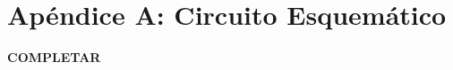 \appendix
\appendixpage
\addappheadtotoc

\section*{Apéndice A: Circuito Esquemático}
\label{appendix:circuito_esquematico}

\textbf{{\color{red} COMPLETAR}}